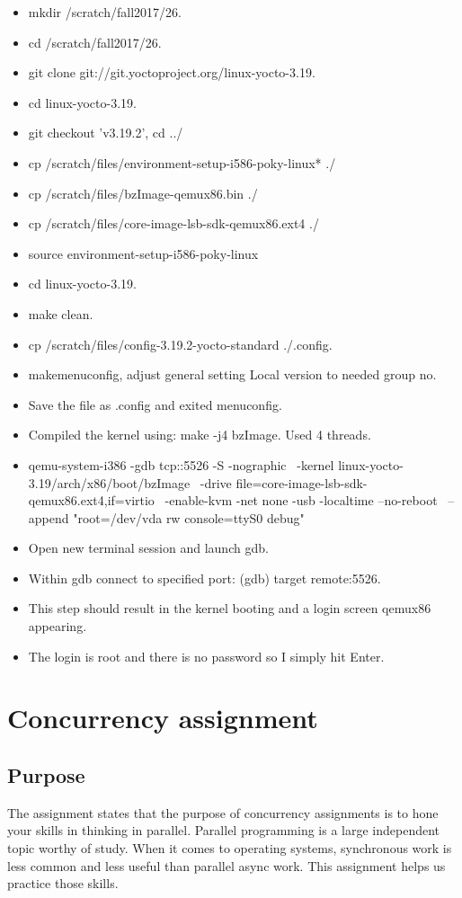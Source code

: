 \documentclass[letterpaper,10pt,fleqn]{article}
\begin{document}
	\begin{itemize}
		\item mkdir /scratch/fall2017/26.
		\item cd /scratch/fall2017/26.
		\item git clone git://git.yoctoproject.org/linux-yocto-3.19.
		\item cd linux-yocto-3.19.
		\item git checkout 'v3.19.2', cd ../
		\item cp /scratch/files/environment-setup-i586-poky-linux* ./
		\item cp /scratch/files/bzImage-qemux86.bin ./
		\item cp /scratch/files/core-image-lsb-sdk-qemux86.ext4 ./
		\item source environment-setup-i586-poky-linux
		\item cd linux-yocto-3.19.
		\item make clean.
		\item cp /scratch/files/config-3.19.2-yocto-standard ./.config.
		\item makemenuconfig, adjust general setting Local version to needed group no.
		\item Save the file as .config and exited menuconfig.
		\item Compiled the kernel using: make -j4 bzImage. Used 4 threads.
		\item qemu-system-i386 -gdb tcp::5526 -S -nographic \
    -kernel linux-yocto-3.19/arch/x86/boot/bzImage \
    -drive file=core-image-lsb-sdk-qemux86.ext4,if=virtio \
    -enable-kvm -net none -usb -localtime --no-reboot \
    --append "root=/dev/vda rw console=ttyS0 debug"
		\item Open new terminal session and launch gdb.
		\item Within gdb connect to specified port: (gdb) target remote:5526.
		\item This step should result in the kernel booting and a login screen qemux86 appearing.
		\item The login is root and there is no password so I simply hit Enter.

	\end{itemize}


	\section*{Concurrency assignment}
	\subsection*{Purpose}
	The assignment states that the purpose of concurrency assignments is to hone your skills in thinking in parallel.
	Parallel programming is a large independent topic worthy of study.
	When it comes to operating systems, synchronous work is less common and less useful than parallel async work.
	This assignment helps us practice those skills.
\end{document}
